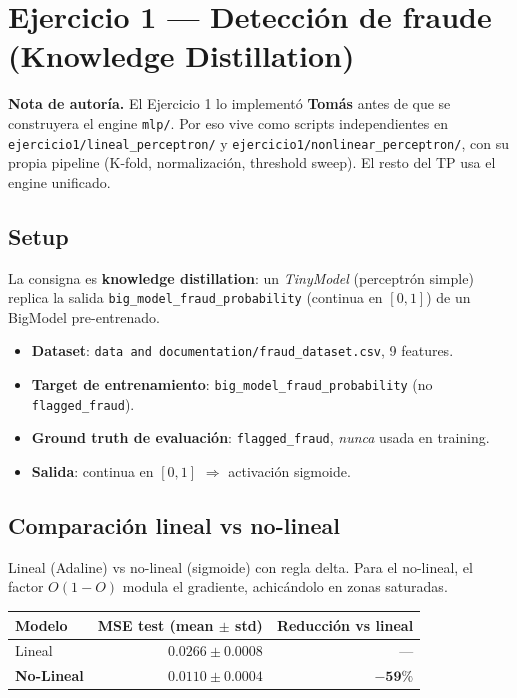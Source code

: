 \documentclass[11pt,a4paper]{article}
\newcommand{\code}[1]{\texttt{\textcolor{accent}{#1}}}
\newcommand{\file}[1]{\texttt{\small #1}}
\begin{document}
\section{Ejercicio 1 — Detección de fraude (Knowledge Distillation)}\label{sec:ej1}

\begin{tcolorbox}[enhanced, colback=bgbox, colframe=muted, boxrule=0pt, leftrule=4pt,
  arc=2pt, outer arc=0pt, left=10pt, right=10pt, top=8pt, bottom=8pt]
\textbf{Nota de autoría.} El Ejercicio 1 lo implementó \textbf{Tomás} antes de que se construyera el engine \code{mlp/}. Por eso vive como scripts independientes en \file{ejercicio1/lineal\_perceptron/} y \file{ejercicio1/nonlinear\_perceptron/}, con su propia pipeline (K-fold, normalización, threshold sweep). El resto del TP usa el engine unificado.
\end{tcolorbox}

\subsection{Setup}
La consigna es \textbf{knowledge distillation}: un \emph{TinyModel} (perceptrón simple) replica la salida \texttt{big\_model\_fraud\_probability} (continua en \([0,1]\)) de un BigModel pre-entrenado.

\begin{itemize}[leftmargin=1.4em, itemsep=2pt]
  \item \textbf{Dataset}: \file{data\,and\,documentation/fraud\_dataset.csv}, 9 features.
  \item \textbf{Target de entrenamiento}: \code{big\_model\_fraud\_probability} (no \code{flagged\_fraud}).
  \item \textbf{Ground truth de evaluación}: \code{flagged\_fraud}, \emph{nunca} usada en training.
  \item \textbf{Salida}: continua en \([0,1]\) \(\Rightarrow\) activación sigmoide.
\end{itemize}

\subsection{Comparación lineal vs no-lineal}

Lineal (Adaline) vs no-lineal (sigmoide) con regla delta. Para el no-lineal, el factor \(O(1-O)\) modula el gradiente, achicándolo en zonas saturadas.

\begin{center}
\begin{tabular}{@{}lrr@{}}
\toprule
\textbf{Modelo} & \textbf{MSE test (mean \(\pm\) std)} & \textbf{Reducción vs lineal} \\
\midrule
Lineal     & \(0.0266 \pm 0.0008\) & --- \\
\rowcolor{accent2!10}
\textbf{No-Lineal} & \(\boldsymbol{0.0110 \pm 0.0004}\) & \(\boldsymbol{-59\%}\) \\
\bottomrule
\end{tabular}
\end{center}
\end{document}
